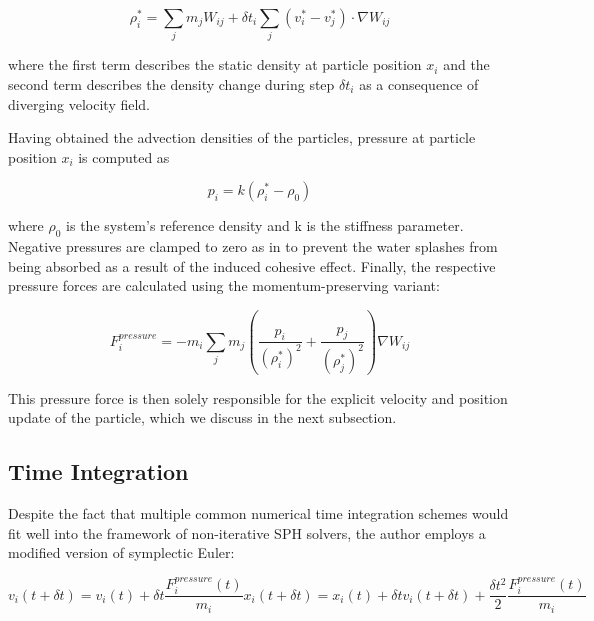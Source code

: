 \documentclass[
	11pt, 
	DIV10,
	ngerman,
	a4paper, 
	oneside, 
	headings=normal, 
	captions=tableheading,
	final, 
	numbers=noenddot
]{scrartcl}
\begin{document}
\begin{equation}
	\label{eq4}
	\rho_{i}^{*} = \sum_{j}m_{j}W_{ij} + \delta t_{i}\sum_{j}(v_{i}^{*} - v_{j}^{*})\cdot \nabla W_{ij}
\end{equation}

where the first term describes the static density at particle position $ x_{i} $ and the second term describes the density change during step $ \delta t_{i} $ as a consequence of diverging velocity field.
\par
Having obtained the advection densities of the particles, pressure at particle position $ x_{i} $ is computed as

\begin{equation}
	\label{eq8}
	p_{i} = k(\rho_{i}^{*} - \rho_{0})
\end{equation}

where $ \rho_{0} $ is the system's reference density and k is the stiffness parameter. Negative pressures are clamped to zero as in \cite{ihmsen2013implicit} to prevent the water splashes from being absorbed as a result of the induced cohesive effect. Finally, the respective pressure forces are calculated using the momentum-preserving variant:

\begin{equation}
	\label{eq5}
	F_{i}^{pressure} = -m_{i}\sum_{j}m_{j}(\frac{p_{i}}{(\rho_{i}^{*})^{2}} + \frac{p_{j}}{(\rho_{j}^{*})^{2}})\nabla W_{ij}
\end{equation}

This pressure force is then solely responsible for the explicit velocity and position update of the particle, which we discuss in the next subsection.

\subsection{Time Integration}

Despite the fact that multiple common numerical time integration schemes would fit well into the framework of non-iterative SPH solvers, the author employs a modified version of symplectic Euler:

\begin{equation}
	\label{eq6}
	v_{i}(t + \delta t) = v_{i}(t) + \delta	t\frac{F_{i}^{pressure}(t)}{m_{i}}
	x_{i}(t + \delta t) = x_{i}(t) + \delta t v_{i}(t + \delta t) + \frac{\delta t^{2}}{2}\frac{F_{i}^{pressure}(t)}{m_{i}}
\end{equation}
\end{document}
